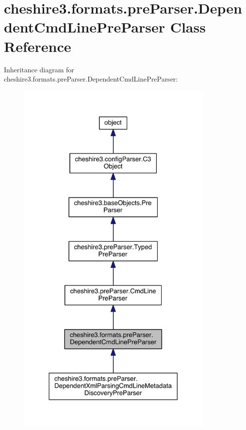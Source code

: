 \hypertarget{classcheshire3_1_1formats_1_1pre_parser_1_1_dependent_cmd_line_pre_parser}{\section{cheshire3.\-formats.\-pre\-Parser.\-Dependent\-Cmd\-Line\-Pre\-Parser Class Reference}
\label{classcheshire3_1_1formats_1_1pre_parser_1_1_dependent_cmd_line_pre_parser}
}


Inheritance diagram for cheshire3.\-formats.\-pre\-Parser.\-Dependent\-Cmd\-Line\-Pre\-Parser\-:
\nopagebreak
\begin{figure}[H]
\begin{center}
\leavevmode
\includegraphics[width=278pt]{classcheshire3_1_1formats_1_1pre_parser_1_1_dependent_cmd_line_pre_parser__inherit__graph}
\end{center}
\end{figure}


